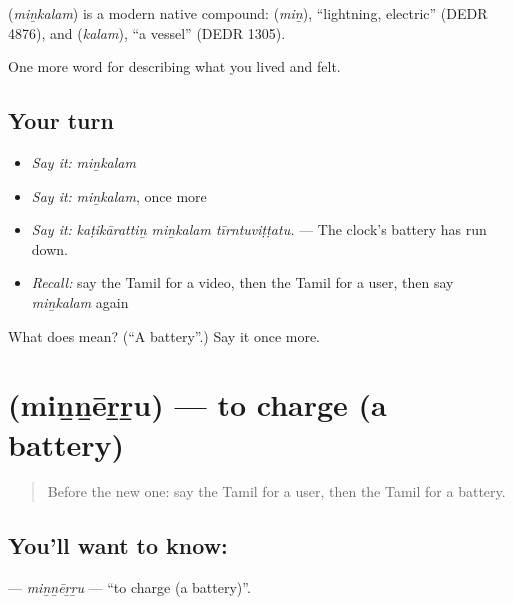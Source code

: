 \begin{cousinweb}
\textbf{} (\emph{miṉkalam}) is a modern native compound:  (\emph{miṉ}), \textquotedblleft{}lightning, electric\textquotedblright{} (DEDR 4876), and  (\emph{kalam}), \textquotedblleft{}a vessel\textquotedblright{} (DEDR 1305).
\end{cousinweb}

\begin{grammarlens}[title={What you've built}]
One more word for describing what you lived and felt.
\end{grammarlens}

\subsection*{Your turn}
\begin{itemize}
\raggedright
  \item \emph{Say it:} \emph{miṉkalam}
  \item \emph{Say it:} \emph{miṉkalam}, once more
  \item \emph{Say it:} \emph{kaṭikārattiṉ miṉkalam tīrntuviṭṭatu.} — The clock's battery has run down.
  \item \emph{Recall:} say the Tamil for a video, then the Tamil for a user, then say \emph{miṉkalam} again
\end{itemize}

\begin{tcolorbox}[breakable,colback=teal!4,colframe=teal!35!black,title={Before you move on}]
What does  mean? (\textquotedblleft{}A battery\textquotedblright{}.) Say it once more.
\end{tcolorbox}
\section[\texorpdfstring{\ta{மின்னேற்று} (miṉṉēṟṟu)}{மின்னேற்று (miṉṉēṟṟu)}]{ (miṉṉēṟṟu) — to charge (a battery)}

\label{lesson:TA-C517-minnerru}



\begin{quote}
Before the new one: say the Tamil for a user, then the Tamil for a battery.
\end{quote}

\subsection*{You'll want to know: }
\textbf{} — \emph{miṉṉēṟṟu} — \textquotedblleft{}to charge (a battery)\textquotedblright{}.

